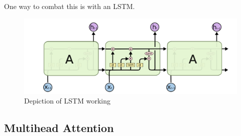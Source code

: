 \documentclass[12pt]{article}
\begin{document}
One way to combat this is with an LSTM.

\begin{figure}[htb]
\centering
\includegraphics[width=\textwidth]{figs/lstm-diagram.png}
\caption{Depiction of LSTM working}
\label{fig:lstmdiagram}
\end{figure}

\subsection{Multihead Attention}
\label{sub:attn}
\end{document}
